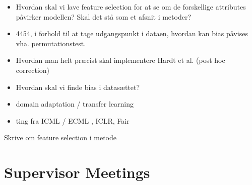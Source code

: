 \documentclass[11pt, fleqn]{article}
\begin{document}
	\begin{itemize}
		\item  Hvordan skal vi lave feature selection for at se om de forskellige attributes påvirker modellen? Skal det stå som et afsnit i metoder?
		
		\item 4454, i forhold til at tage udgangspunkt i dataen, hvordan kan bias påvises vha. permutationstest. 
		
		\item Hvordan man helt præcist skal implementere Hardt et al. (post hoc correction)
		
		\item Hvordan skal vi finde bias i datasættet? 
		
		\item domain adaptation / transfer learning
		
		\item ting fra ICML / ECML , ICLR, Fair 
		
	\end{itemize}
	
	Skrive om feature selection i metode
	
	
\section*{Supervisor Meetings}
	
\end{document}
